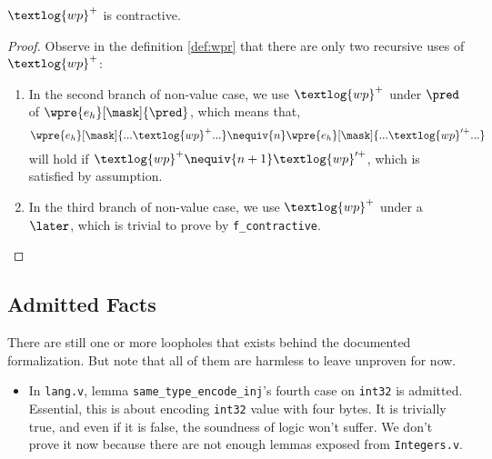 \begin{lemma}
$\textlog{wp}^{+}$ is contractive.
\end{lemma}
\begin{proof}
  Observe in the definition \ref{def:wpr} that there are only two recursive uses of $\textlog{wp}^{+}$:
  \begin{enumerate}
    \item In the second branch of non-value case, we use $\textlog{wp}^{+}$ under $\pred$ of $\wpre{e_h}[\mask]{\pred}$,
    which means that, 
    \[\wpre{e_h}[\mask]{ ... \textlog{wp}^{+} ... } \nequiv{n} \wpre{e_h}[\mask]{ ... \textlog{wp}'^{+} ... } \]
    will hold if \( \textlog{wp}^{+} \nequiv{n + 1} \textlog{wp}'^{+} \), which is satisfied by assumption.
    \item In the third branch of non-value case, we use $\textlog{wp}^{+}$ under a $\later$, which is trivial to prove
    by \texttt{f\_contractive}.
  \end{enumerate}
\end{proof}

\subsection{Admitted Facts}

There are still one or more loopholes that exists behind the documented formalization.
But note that all of them are harmless to leave unproven for now.

\begin{itemize}
\item In \texttt{lang.v}, lemma \texttt{same\_type\_encode\_inj}'s fourth case on \texttt{int32} is admitted.
  Essential, this is about encoding \texttt{int32} value with four bytes. It is trivially true, and even if
  it is false, the soundness of logic won't suffer.  
  We don't prove it now because there are not enough lemmas exposed from \texttt{Integers.v}.
\end{itemize}
